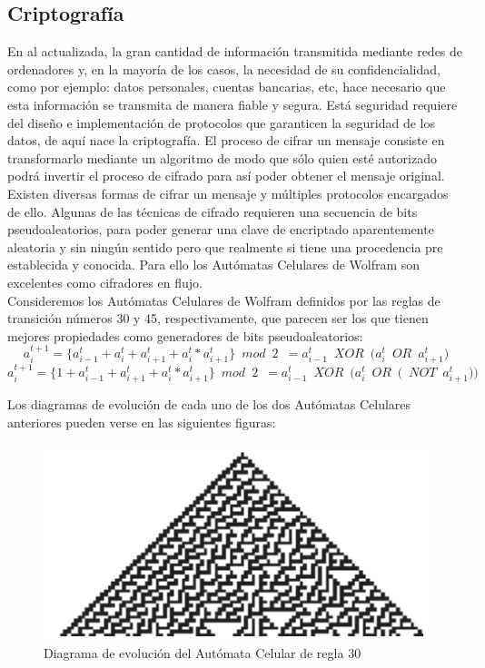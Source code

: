 \subsection{Criptografía}
En al actualizada, la gran cantidad de información transmitida mediante redes de ordenadores y, en la mayoría de los casos, la necesidad de su confidencialidad, como por ejemplo: datos personales, cuentas bancarias, etc, hace necesario que esta información se transmita de manera fiable y segura. Está seguridad requiere del diseño e implementación de protocolos que garanticen la seguridad de los datos, de aquí nace la criptografía. El proceso de cifrar un mensaje consiste en transformarlo mediante un algoritmo de modo que sólo quien esté autorizado podrá invertir el proceso de cifrado para así poder obtener el mensaje original. Existen diversas formas de cifrar un mensaje y múltiples protocolos encargados de ello. Algunas de las técnicas de cifrado requieren una secuencia de bits pseudoaleatorios, para poder generar una clave de encriptado aparentemente aleatoria y sin ningún sentido pero que realmente si tiene una procedencia pre establecida y conocida. Para ello los Autómatas Celulares de Wolfram son excelentes como cifradores en flujo.\\

Consideremos los Autómatas Celulares de Wolfram definidos por las reglas de transición números 30 y 45, respectivamente, que parecen ser los que tienen mejores propiedades como generadores de bits pseudoaleatorios:
$$a_i^{t+1}  =  \lbrace a_{i-1}^t + a_i^t + a_{i+1}^t + a_i^t * a_{i+1}^t \rbrace \enspace  mod\enspace 2\enspace = a_{i-1}^t  \enspace XOR \enspace \big( a_i^t \enspace OR \enspace a_{i+1}^t \big) $$ 
$$a_i^{t+1}  =  \lbrace 1 + a_{i-1}^t + a_{i+1}^t + a_i^t * a_{i+1}^t \rbrace \enspace  mod\enspace 2\enspace = a_{i-1}^t  \enspace XOR \enspace \big( a_i^t \enspace OR \enspace \big( \enspace NOT \enspace a_{i+1}^t \big)\big) $$ 

Los diagramas de evolución de cada uno de los dos Autómatas Celulares anteriores pueden verse en las siguientes figuras:

\begin{figure}[H]
\centering
\includegraphics[scale=0.7]{imagenes/regla_30.png}
\caption{Diagrama de evolución del Autómata Celular de regla 30}
\end{figure}


